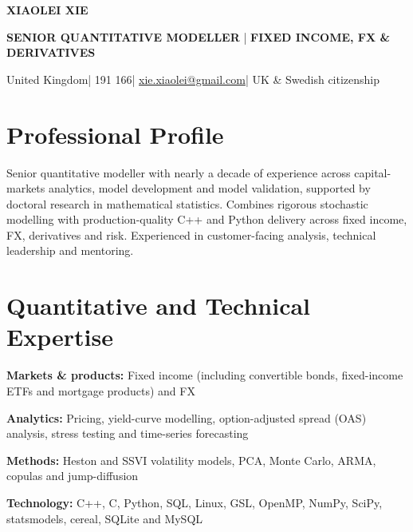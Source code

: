 \documentclass[10pt,a4paper]{article}
\newcommand{\skillline}[2]{%
  \textbf{#1:} #2\par\vspace{0.15ex}
}
\begin{document}
{\fontsize{24}{26}\selectfont\bfseries\color{Navy}XIAOLEI XIE}\par
\vspace{0.25ex}
{\large\bfseries\color{AccentBlue}SENIOR QUANTITATIVE MODELLER}
\enspace|\enspace
{\large\bfseries\color{Muted}FIXED INCOME, FX \& DERIVATIVES}\par
\vspace{0.45ex}
{\color{Muted}
United Kingdom\enspace| 191 166\enspace|\enspace
\href{mailto:xie.xiaolei@gmail.com}{xie.xiaolei@gmail.com}\enspace|\enspace
UK \& Swedish citizenship}

\section{Professional Profile}

Senior quantitative modeller with nearly a decade of experience across
capital-markets analytics, model development and model validation,
supported by doctoral research in mathematical statistics. Combines
rigorous stochastic modelling with production-quality C++ and Python
delivery across fixed income, FX, derivatives and risk. Experienced
in customer-facing analysis, technical leadership and mentoring.

\section{Quantitative and Technical Expertise}

\skillline{Markets \& products}{Fixed income (including convertible
bonds, fixed-income ETFs and mortgage products) and FX} \skillline{Analytics}{Pricing,
yield-curve modelling, option-adjusted spread (OAS) analysis, stress
testing and time-series forecasting} \skillline{Methods}{Heston
and SSVI volatility models, PCA, Monte Carlo, ARMA, copulas and jump-diffusion}
\skillline{Technology}{C++, C, Python, SQL, Linux, GSL, OpenMP,
NumPy, SciPy, statsmodels, cereal, SQLite and MySQL}

\end{document}
